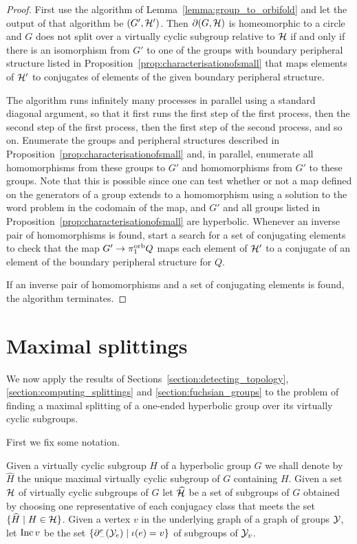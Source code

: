 \begin{proof} 
First use the algorithm of Lemma~\ref{lemma:group_to_orbifold} and let the output of that algorithm be $(G', \mathcal{H}')$. 
Then $\partial(G, \mathcal{H})$ is homeomorphic to a circle and $G$ does not split over a virtually cyclic subgroup relative to $\mathcal{H}$ if and only if there is an isomorphism from $G'$ to one of the groups with boundary peripheral structure listed in Proposition~\ref{prop:characterisationofsmall} that maps elements of $\mathcal{H}'$ to conjugates of elements of the given boundary peripheral structure.  

The algorithm runs infinitely many processes in parallel using a standard diagonal argument, so that it first runs the first step of the first process, then the second step of the first process, then the first step of the second process, and so on.
Enumerate the groups and peripheral structures described in Proposition~\ref{prop:characterisationofsmall} and, in parallel, enumerate all homomorphisms from these groups to $G'$ and homomorphisms from $G'$ to these groups. 
Note that this is possible since one can test whether or not a map defined on the generators of a group extends to a homomorphism using a solution to the word problem in the codomain of the map, and $G'$ and all groups listed in Proposition~\ref{prop:characterisationofsmall} are hyperbolic. 
Whenever an inverse pair of homomorphisms is found, start a search for a set of conjugating elements to check that the map $G' \to \pi_1^{\mathrm{orb}} Q$ maps each element of $\mathcal{H}'$ to a conjugate of an element of the boundary peripheral structure for $Q$.

If an inverse pair of homomorphisms and a set of conjugating elements is found, the algorithm terminates.
\end{proof}

\section{Maximal splittings}\label{section:maximal_splittings}

We now apply the results of Sections~\ref{section:detecting_topology}, \ref{section:computing_splittings} and \ref{section:fuchsian_groups} to the problem of finding a maximal splitting of a one-ended hyperbolic group over its virtually cyclic subgroups.

First we fix some notation.

\begin{definition}
  Given a virtually cyclic subgroup $H$ of a hyperbolic group $G$ we shall denote by $\widehat{H}$ the unique maximal virtually cyclic subgroup of $G$ containing $H$.
  Given a set $\mathcal{H}$ of virtually cyclic subgroups of $G$ let $\widehat{\mathcal{H}}$ be a set of subgroups of $G$ obtained by choosing one representative of each conjugacy class that meets the set $\{\widehat{H} \mid H \in \mathcal{H}\}$.
  Given a vertex $v$ in the underlying graph of a graph of groups $\mathcal{Y}$, let $\operatorname{\mathrm{Inc}} v$ be the set $\{\partial^e_{-}(\mathcal{Y}_e) \mid \operatorname{\iota}(e) = v\}$ of subgroups of $\mathcal{Y}_v$.
\end{definition}

